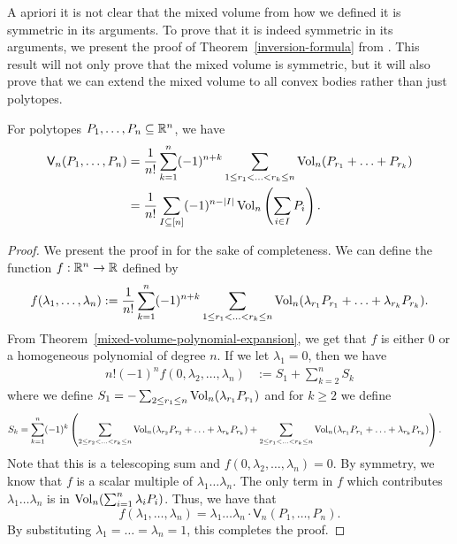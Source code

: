 \documentclass{puthesis-UG}
\begin{document}
A apriori it is not clear that the mixed volume from how we defined it is symmetric in its arguments. To prove that it is indeed symmetric in its arguments, we present the proof of Theorem~\ref{inversion-formula} from \cite{schneider_2013}. This result will not only prove that the mixed volume is symmetric, but it will also prove that we can extend the mixed volume to all convex bodies rather than just polytopes. 

\begin{thm} \label{inversion-formula}
	For polytopes $P_1, \ldots, P_n \subseteq \mathbb{R}^n$, we have
	\begin{align*}
		\mathsf{V}_n(P_1, \ldots, P_n) & = \frac{1}{n!} \sum_{k = 1}^n (-1)^{n+k} \sum_{1 \leq r_1 < \ldots < r_k \leq n} \operatorname{Vol}_n (P_{r_1} + \ldots + P_{r_k}) \\
		& = \frac{1}{n!} \sum_{I \subseteq [n]} (-1)^{n - |I|} \operatorname{Vol}_n \left ( \sum_{i \in I} P_i \right ).
	\end{align*}
\end{thm}

\begin{proof}
	We present the proof in \cite{schneider_2013} for the sake of completeness. We can define the function $f : \mathbb{R}^n \to \mathbb{R}$ defined by 
	\[
		f(\lambda_1, \ldots, \lambda_n) := \frac{1}{n!} \sum_{k = 1}^n (-1)^{n+k} \sum_{1 \leq r_1 < \ldots < r_k \leq n} \operatorname{Vol}_n(\lambda_{r_1} P_{r_1} + \ldots+ \lambda_{r_k} P_{r_k}).
	\]
	From Theorem~\ref{mixed-volume-polynomial-expansion}, we get that $f$ is either $0$ or a homogeneous polynomial of degree $n$. If we let $\lambda_1 = 0$, then we have
	\begin{align*}
		n! (-1)^n f(0, \lambda_2, \ldots, \lambda_n) & := S_1 + \sum_{k = 2}^n S_k
	\end{align*}
	where we define $S_1 = - \sum_{2 \leq r_1 \leq n} \operatorname{Vol}_n (\lambda_{r_1} P_{r_1})$ and for $k \geq 2$ we define
	\begin{align*}
		S_k & = \sum_{k = 1}^n (-1)^k \left ( \sum_{2 \leq r_2 < \ldots < r_k \leq n} \operatorname{Vol}_n(\lambda_{r_2} P_{r_2} + \ldots + \lambda_{r_k} P_{r_k}) + \sum_{2 \leq r_1 < \ldots < r_k \leq n} \operatorname{Vol}_n (\lambda_{r_1} P_{r_1} + \ldots + \lambda_{r_k} P_{r_k})\right ).
	\end{align*}
	Note that this is a telescoping sum and $f(0, \lambda_2, \ldots, \lambda_n) = 0$. By symmetry, we know that $f$ is a scalar multiple of $\lambda_1 \ldots \lambda_n$. The only term in $f$ which contributes $\lambda_1 \ldots \lambda_n$ is in $\operatorname{Vol}_n (\sum_{i = 1}^n \lambda_i P_i)$. Thus, we have that 
	\[
		f(\lambda_1, \ldots, \lambda_n) = \lambda_1 \ldots \lambda_n \cdot \mathsf{V}_n (P_1, \ldots, P_n).
	\]
	By substituting $\lambda_1 = \ldots = \lambda_n = 1$, this completes the proof. 
\end{proof}
\end{document}
